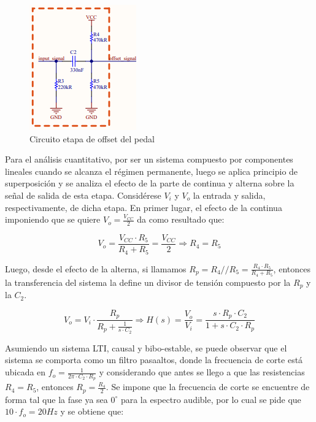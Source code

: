 \begin{figure}[H]
    \centering
    \includegraphics[]{../EJ5/Recursos/circuito_offset.PNG}
    \caption{Circuito etapa de offset del pedal}
    \label{fig:circuito_offset}
\end{figure}

Para el an\'alisis cuantitativo, por ser un sistema compuesto por componentes lineales cuando se alcanza el r\'egimen permanente, luego se aplica
principio de superposici\'on y se analiza el efecto de la parte de continua y alterna sobre la se\~nal de salida de esta etapa. Consid\'erese $V_i$ y $V_o$ la entrada y salida, respectivamente,
de dicha etapa. En primer lugar, el efecto de la continua imponiendo que se quiere $V_o = \frac{V_{CC}}{2}$ da como resultado que:

\begin{equation}
    V_o = \frac{V_{CC} \cdot R_5}{R_4 + R_5} = \frac{V_{CC}}{2} 
    \Rightarrow
    R_4 = R_5
    \label{eq:divisor_tension}
\end{equation}

Luego, desde el efecto de la alterna, si llamamos $R_p = R_4 // R_5 = \frac{R_4 \cdot R_5}{R_4 + R_5}$, entonces la transferencia del sistema
la define un divisor de tensi\'on compuesto por la $R_p$ y la $C_2$.

\begin{equation*}
    V_o = V_i \cdot \frac{R_p}{R_p + \frac{1}{s \cdot C_2}}
    \Rightarrow
    H(s) = \frac{V_o}{V_i} = \frac{s \cdot R_p \cdot C_2}{1 + s \cdot C_2 \cdot R_p}
\end{equation*}

Asumiendo un sistema LTI, causal y bibo-estable, se puede observar que el sistema se comporta como un filtro pasaaltos, donde
la frecuencia de corte est\'a ubicada en $f_o = \frac{1}{2 \pi \cdot C_2 \cdot R_p}$ y considerando que antes se llego a que las resistencias
$R_4 = R_5$, entonces $R_p = \frac{R_4}{2}$. Se impone que la frecuencia de corte se encuentre de forma tal que la fase ya sea $0^{\circ}$ para 
la espectro audible, por lo cual se pide que $10 \cdot f_o = 20Hz$ y se obtiene que:


